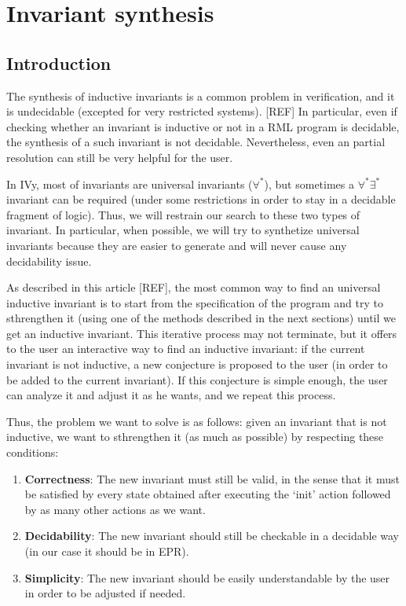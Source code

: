 \documentclass[11pt,a4paper,oldfontcommands]{memoir}
\begin{document}
\chapter{Invariant synthesis}

    \section{Introduction}

    The synthesis of inductive invariants is a common problem in verification, and it is undecidable (excepted for very restricted systems). [REF]
    In particular, even if checking whether an invariant is inductive or not in a RML program is decidable, the synthesis of a such invariant is not decidable.
    Nevertheless, even an partial resolution can still be very helpful for the user.

    In IVy, most of invariants are universal invariants (\(\forall^*\)), but sometimes a \(\forall^*\exists^*\) invariant can be required (under some restrictions in order
    to stay in a decidable fragment of logic). Thus, we will restrain our search to these two types of invariant.
    In particular, when possible, we will try to synthetize universal invariants because they are easier to generate and will never cause any decidability issue.
    
    As described in this article [REF], the most common way to find an universal inductive invariant is to start from the specification of the program
    and try to sthrengthen it (using one of the methods described in the next sections) until we get an inductive invariant.
    This iterative process may not terminate, but it offers to the user an interactive way to find an inductive invariant:
    if the current invariant is not inductive, a new conjecture is proposed to the user (in order to be added to the current invariant).
    If this conjecture is simple enough, the user can analyze it and adjust it as he wants, and we repeat this process.

    Thus, the problem we want to solve is as follows:
    given an invariant that is not inductive, we want to sthrengthen it (as much as possible) by respecting these conditions:
    \begin{enumerate}
        \item \textbf{Correctness}: The new invariant must still be valid, in the sense that it must be satisfied by every state obtained
        after executing the `init' action followed by as many other actions as we want.
        \item \textbf{Decidability}: The new invariant should still be checkable in a decidable way (in our case it should be in EPR).
        \item \textbf{Simplicity}: The new invariant should be easily understandable by the user in order to be adjusted if needed.
    \end{enumerate}
\end{document}
